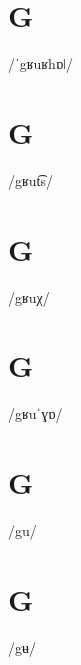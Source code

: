 \documentclass[10pt,a4paper,twoside]{book}
\begin{document}
\section*{G}

\begin{multicols}{3}
 {/ˈgʁuʁhɒǀ/} {}
\end{multicols}

\section*{G}

\begin{multicols}{3}
 {/gʁut͡s/} {}
\end{multicols}

\section*{G}

\begin{multicols}{3}
 {/gʁuχ/} {}
\end{multicols}

\section*{G}

\begin{multicols}{3}
 {/gʁuˈɣɒ/} {}
\end{multicols}

\section*{G}

\begin{multicols}{3}
 {/gu/} {}
\end{multicols}

\section*{G}

\begin{multicols}{3}
 {/gʉ/} {}
\end{multicols}
\end{document}
